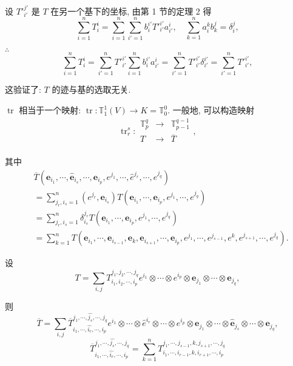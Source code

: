 \documentclass{ctexart}
\begin{document}
设 ${T'}_{i'}^{j'}$ 是 $T$ 在另一个基下的坐标, 由第 1 节的定理 2 得
\[\sum\limits_{i=1}^nT_i^i=\sum\limits_{i=1}^n\sum\limits_{i'=1}^nb_i^{i'}{T'}_{i'}^{i'}a_{i'}^i,\quad\sum\limits_{k=1}^na_i^kb_k^j=\delta_i^j,\]

$\therefore$
\[\sum\limits_{i=1}^nT_i^i=\sum\limits_{i'=1}^n{T'}_{i'}^{i'}\sum\limits_{i=1}^nb_i^{i'}a_{i'}^i=\sum\limits_{i'=1}^n{T'}_{i'}^{i'}\delta_{i'}^{i'}=\sum\limits_{i'=1}^n{T'}_{i'}^{i'},\]

这验证了: $T$ 的迹与基的选取无关.

$\operatorname{tr}$ 相当于一个映射: $\operatorname{tr}:\mathbb{T}_1^1(V)\to K=\mathbb{T}_0^0$. 一般地, 可以构造映射
\[\operatorname{tr}_r^s:\begin{array}{rcl}
    \mathbb{T}_p^q & \to & \mathbb{T}_{p-1}^{q-1} \\
    T & \to & \overline{T} \\
\end{array},\]

其中
\begin{align*}
    & \overline{T}(\boldsymbol{e}_{i_1},\cdots,\hat{\boldsymbol{e}}_{i_s},\cdots,\boldsymbol{e}_{i_p},e^{j_1},\cdots,\hat{e}^{j_r},\cdots,e^{j_q}) \\
    & =\sum\limits_{j_r,i_s=1}^n(e^{j_r},\boldsymbol{e}_{i_s})T(\boldsymbol{e}_{i_1},\cdots,\boldsymbol{e}_{i_p},e^{j_1},\cdots,e^{j_q}) \\
    & =\sum\limits_{j_r,i_s=1}^n\delta_{i_s}^{j_r}T(\boldsymbol{e}_{i_1},\cdots,\boldsymbol{e}_{i_p},e^{j_1},\cdots,e^{j_q}) \\
    & =\sum\limits_{k=1}^nT(\boldsymbol{e}_{i_1},\cdots,\boldsymbol{e}_{i_{s-1}},\boldsymbol{e}_k,\boldsymbol{e}_{i_{s+1}},\cdots,\boldsymbol{e}_{i_p},e^{j_1},\cdots,e^{j_{s-1}},e^{k},e^{j_{s+1}},\cdots,e^{j_q}).
\end{align*}

设
\[T=\sum\limits_{i,j}T^{j_1,j_2,\cdots,j_q}_{i_1,i_2,\cdots,i_p}e^{i_1}\otimes\cdots\otimes e^{i_p}\otimes\boldsymbol{e}_{j_1}\otimes\cdots\otimes\boldsymbol{e}_{j_q},\]

则
\[\overline{T}=\sum\limits_{i,j}\overline{T}^{j_1,\cdots,\widehat{j_s},\cdots,j_q}_{i_1,\cdots,\widehat{i_r},\cdots,i_p}e^{i_1}\otimes\cdots\otimes\hat{e}^{i_r}\otimes\cdots\otimes e^{i_p}\otimes\boldsymbol{e}_{j_1}\otimes\cdots\otimes\hat{\boldsymbol{e}}_{j_s}\otimes\cdots\otimes\boldsymbol{e}_{j_q},\]
\[\overline{T}^{j_1,\cdots,\widehat{j_s},\cdots,j_q}_{i_1,\cdots,\widehat{i_r},\cdots,i_p}=\sum\limits_{k=1}^nT^{j_1,\cdots,j_{s-1},k,j_{s+1},\cdots,j_q}_{i_1,\cdots,i_{r-1},k,i_{r+1},\cdots,i_p}\]
\end{document}

